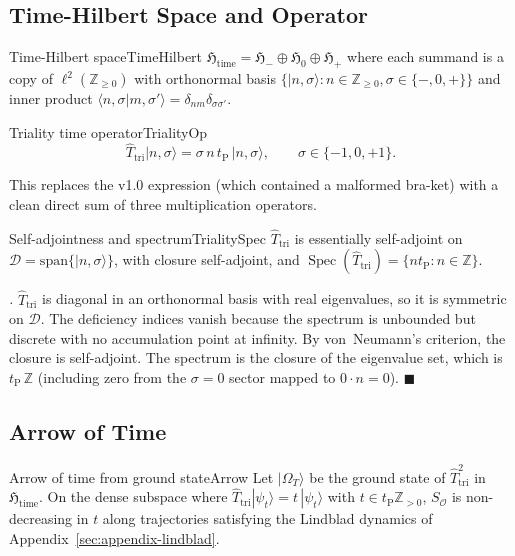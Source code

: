 \documentclass[11pt,a4paper]{article}
\theoremstyle{myrmk}
\renewenvironment{proof}[1][\proofname]{%
  \par\noindent\textit{#1.}\enspace\ignorespaces}{\hfill$\blacksquare$\par\medskip}
\newcommand{\tP}{t_{\mathrm{P}}}
\newcommand{\Spec}{\operatorname{Spec}}
\newcommand{\ket}[1]{|#1\rangle}
\newcommand{\braket}[2]{\langle#1|#2\rangle}
\begin{document}
\subsection{Time-Hilbert Space and Operator}

\begin{definition}{Time-Hilbert space}{TimeHilbert}
$\mathfrak H_{\mathrm{time}}=\mathfrak H_-\oplus\mathfrak H_0\oplus\mathfrak H_+$ where
each summand is a copy of $\ell^2(\mathbb{Z}_{\geq 0})$ with orthonormal basis
$\{\ket{n,\sigma}:n\in\mathbb{Z}_{\geq 0},\sigma\in\{-,0,+\}\}$ and inner product
$\braket{n,\sigma}{m,\sigma'}=\delta_{nm}\delta_{\sigma\sigma'}$.
\end{definition}

\begin{definition}{Triality time operator}{TrialityOp}
\begin{equation}
  \hat T_{\mathrm{tri}}\ket{n,\sigma}
   = \sigma\,n\,\tP\,\ket{n,\sigma},
   \qquad \sigma\in\{-1,0,+1\}.
  \label{eq:trialityDef}
\end{equation}
\end{definition}

This replaces the v1.0 expression (which contained a malformed bra-ket) with a clean
direct sum of three multiplication operators.

\begin{theorem}{Self-adjointness and spectrum}{TrialitySpec}
$\hat T_{\mathrm{tri}}$ is essentially self-adjoint on
$\mathcal{D}=\mathrm{span}\{\ket{n,\sigma}\}$, with closure self-adjoint, and
$\Spec(\hat T_{\mathrm{tri}})=\{n\tP : n\in\mathbb{Z}\}$.
\end{theorem}

\begin{proof}
$\hat T_{\mathrm{tri}}$ is diagonal in an orthonormal basis with real eigenvalues, so
it is symmetric on $\mathcal{D}$. The deficiency indices vanish because the spectrum
is unbounded but discrete with no accumulation point at infinity. By von~Neumann's
criterion, the closure is self-adjoint. The spectrum is the closure of the eigenvalue
set, which is $\tP\,\mathbb{Z}$ (including zero from the $\sigma=0$ sector mapped to
$0\cdot n=0$).
\end{proof}

\subsection{Arrow of Time}

\begin{theorem}{Arrow of time from ground state}{Arrow}
Let $\ket{\Omega_T}$ be the ground state of $\hat T_{\mathrm{tri}}^{2}$ in
$\mathfrak H_{\mathrm{time}}$. On the dense subspace where
$\hat T_{\mathrm{tri}}\ket{\psi_t}=t\,\ket{\psi_t}$ with $t\in\tP\mathbb{Z}_{>0}$,
$S_{\mathcal{O}}$ is non-decreasing in $t$ along trajectories satisfying the
Lindblad dynamics of Appendix~\ref{sec:appendix-lindblad}.
\end{theorem}
\end{document}
